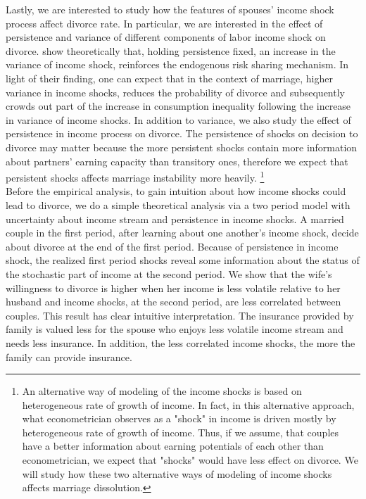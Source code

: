 Lastly, we are interested to study how the features of spouses' income shock process affect divorce rate. In particular, we are interested in the effect of persistence and variance of different components of labor income shock on divorce. \citet{Krueger_Perri_2006_RES} show theoretically that, holding persistence fixed, an increase in the variance of income shock, reinforces the endogenous risk sharing mechanism. In light of their finding, one can expect that in the context of marriage, higher variance in income shocks, reduces the probability of divorce and subsequently crowds out part of the increase in consumption inequality following the increase in variance of income shocks. In addition to variance, we also study the effect of persistence in income process on divorce. The persistence of shocks on decision to divorce may matter because the more persistent shocks contain more information about partners' earning capacity than transitory ones, therefore we expect that persistent shocks affects marriage instability more heavily. \footnote{An alternative way of modeling of the income shocks is based on heterogeneous rate of growth of income. In fact, in this alternative approach, what econometrician observes as a "shock" in income is driven mostly by heterogeneous rate of growth of income. Thus, if we assume, that couples have a better information about earning potentials of each other than econometrician, we expect that "shocks" would have less effect on divorce. We will study how these two alternative ways of modeling of income shocks affects marriage dissolution.} \\

 Before the empirical analysis, to gain intuition about how income shocks could lead to divorce, we do a simple theoretical analysis via a two period model with uncertainty about income stream and persistence in income shocks. A married couple in the first period, after learning about one another's income shock, decide about divorce at the end of the first period. Because of persistence in income shock, the realized first period shocks reveal some information about the status of the stochastic part of  income at the second period.  We show that the wife's willingness to divorce is higher when her income is less volatile relative to her husband and income shocks, at the second period, are less correlated between couples. This result has clear intuitive interpretation. The insurance provided by family is valued less for the spouse who enjoys less volatile income stream and needs less insurance. In addition, the less correlated income shocks, the more the family can provide insurance.  \\

